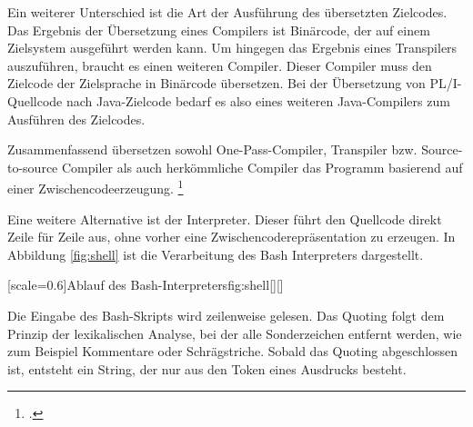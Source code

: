 Ein weiterer Unterschied ist die Art der Ausführung des übersetzten Zielcodes.
Das Ergebnis der Übersetzung eines Compilers ist Binärcode, der auf einem Zielsystem ausgeführt werden kann. Um hingegen das Ergebnis eines Transpilers auszuführen,
braucht es einen weiteren Compiler. Dieser Compiler muss den Zielcode der Zielsprache in Binärcode übersetzen.
Bei der Übersetzung von PL/I-Quellcode nach Java-Zielcode bedarf es also eines weiteren Java-Compilers zum Ausführen des Zielcodes.



Zusammenfassend übersetzen sowohl One-Pass-Compiler, Transpiler bzw. Source-to-source Compiler als auch herkömmliche Compiler das Programm basierend auf einer Zwischencodeerzeugung. \footcite[Vgl. ][S. 18ff. ]{assambly}

Eine weitere Alternative ist der Interpreter. Dieser führt den Quellcode direkt Zeile für Zeile aus, ohne vorher eine Zwischencoderepräsentation zu erzeugen. In Abbildung \ref{fig:shell} ist die Verarbeitung des Bash Interpreters dargestellt.


[scale=0.6]{Ablauf des Bash-Interpreters}{fig:shell}[][]
\pagebreak

Die Eingabe des Bash-Skripts wird zeilenweise gelesen. Das Quoting folgt dem Prinzip der lexikalischen Analyse, bei der alle Sonderzeichen entfernt werden, wie zum Beispiel Kommentare oder Schrägstriche. Sobald das Quoting abgeschlossen ist, entsteht ein String, der nur aus den Token eines Ausdrucks besteht.

